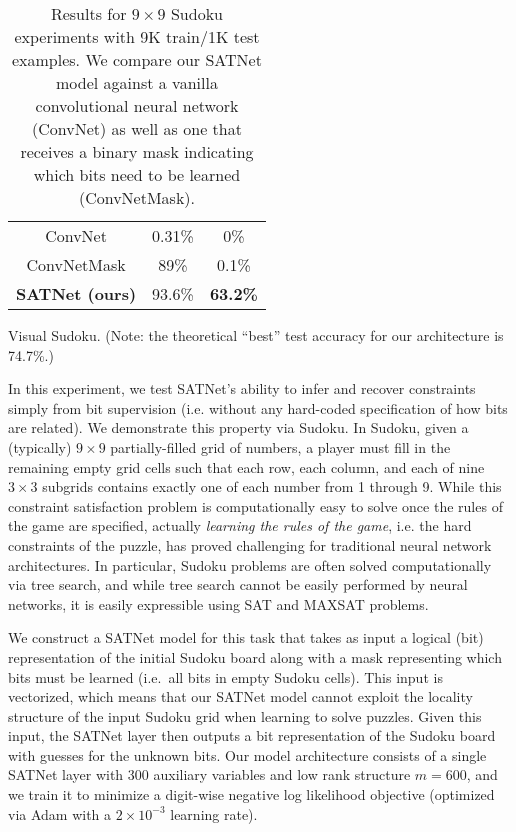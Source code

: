 \documentclass{article}
\begin{document}
\begin{table*}[t!]
\begin{subtable}[t]{0.33\textwidth}
\begin{tabular}{ccc}
	       ConvNet & 0.31\% & 0\% \\
ConvNetMask & 89\% & 0.1\% \\
\textbf{SATNet (ours)}  & 93.6\% &  \textbf{63.2\%} \\
	   \bottomrule
	    \end{tabular}
	    \caption{Visual Sudoku. (Note: the theoretical ``best'' test accuracy for our architecture is 74.7\%.)}
	    \end{subtable}
	    \caption{Results for $9\times 9$ Sudoku experiments with 9K train/1K test examples. We compare our SATNet model against a vanilla convolutional neural network (ConvNet) as well as one that receives a binary mask indicating which bits need to be learned (ConvNetMask).
	   }
	    \label{tab:sudoku-9}
	\end{table*}
	\endgroup
	
	In this experiment, we test SATNet's ability to infer and recover constraints simply from bit supervision (i.e. without any hard-coded specification of how bits are related).
	We demonstrate this property via 
Sudoku.
	In Sudoku, given a (typically) $9 \times 9$ partially-filled grid of numbers, a player must fill in the remaining empty grid cells such that each row, each column, and each of nine $3 \times 3$ subgrids contains exactly one of each number from 1 through 9.
	While this constraint satisfaction problem is computationally easy to solve once the rules of the game are specified, actually \emph{learning the rules of the game}, i.e. the hard constraints of the puzzle, has proved challenging for traditional neural network architectures.
	In particular, Sudoku problems are often solved computationally via tree search, and while tree search cannot be easily performed by neural networks, it is easily expressible 
	using
SAT and MAXSAT problems.
	
	We construct a SATNet model for this task that takes as input a logical (bit) representation of the initial Sudoku board along with a mask representing which bits must be learned (i.e.~all bits in empty Sudoku cells). 
	This input is vectorized, which means that our SATNet model cannot exploit the locality structure of the input Sudoku grid when learning to solve puzzles.
	Given this input, the SATNet layer then outputs a bit representation of the Sudoku board with guesses for the unknown bits.
	Our model architecture consists of a single SATNet layer with 300 auxiliary variables and low rank structure $m =600$, and we train it to minimize a digit-wise negative log likelihood objective (optimized via Adam with a $2\times 10^{-3}$ learning rate).
	
\end{document}
